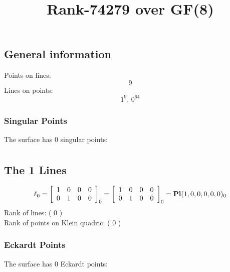 \documentclass{article}
\newcommand\setTBstruts{\def\T{\rule{0pt}{2.6ex}}%
\def\B{\rule[-1.2ex]{0pt}{0pt}}}
\begin{document}
 
\setTBstruts



{\allowdisplaybreaks%






\title{Rank-74279 over GF(8)}
\author{}%
\maketitle%
%
{}



\subsection*{General information}
Points on lines:
$$
9$$
Lines on points:
$$
1^9,\,0^{64}$$
\subsubsection*{Singular Points}
The surface has 0 singular points:\\
\begin{align*}
\end{align*}
\subsection*{The 1 Lines}
$$
\ell_{0} = 
\left[
\begin{array}{*{4}{r}}
1 & 0 & 0 & 0\\
0 & 1 & 0 & 0\\
\end{array}
\right]
_{0}
=
\left[
\begin{array}{*{4}c}
1  & 0  & 0  & 0\\
0  & 1  & 0  & 0\\
\end{array}
\right]_{0}
={\rm\bf Pl}(1,0,0,0,0,0 )_{0}$$
Rank of lines: ( 0 )\\
Rank of points on Klein quadric: ( 0 )\\
\subsubsection*{Eckardt Points}
The surface has 0 Eckardt points:\\
}
\end{document}

